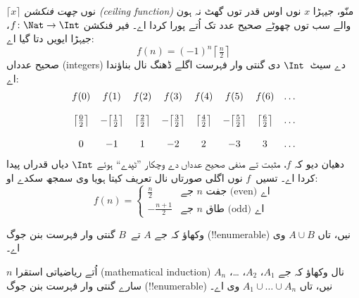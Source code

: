 \documentclass[../../../include/open-logic-section]{subfiles}
\begin{document}
\begin{ex}
$\lceil x \rceil$ نوں \emph{چھت فنکشن (ceiling function)} منّو، جیہڑا
$x$ نوں اوس قدر توں گھٹ نہ ہون والے سب توں چھوٹے صحیح عدد تک اُتے پورا
کردا اے۔ فیر فنکشن
$f \colon \Nat \to \Int$، جیہڑا ایویں دتا گیا اے:
\[
  f(n) = (-1)^{n} \left\lceil\tfrac{n}{2}\right\rceil
\]
صحیح عدداں (integers) دے سیٹ~$\Int$ دی گنتی وار فہرست اگلے ڈھنگ نال
بناؤندا اے:
\[
\begin{array}{c c c c c c c c}
f(0) & f(1) & f(2) & f(3) & f(4) & f(5) & f(6) & \dots \\ \\
\big\lceil \tfrac{0}{2} \big\rceil & -\big\lceil \tfrac{1}{2}\big\rceil &  \big\lceil \tfrac{2}{2} \big\rceil & -\big\lceil \tfrac{3}{2} \big\rceil & \big\lceil \tfrac{4}{2} \big\rceil  & -\big\lceil \tfrac{5}{2}\big\rceil & \big\lceil \tfrac{6}{2} \big\rceil & \dots \\ \\
0 & -1 & 1 & -2 & 2 & -3 & 3& \dots
\end{array}
\]
دھیان دیو کہ $f$، مثبت تے منفی صحیح عدداں دے وچکار ”ٹپدے“ ہوئے
$\Int$ دیاں قدراں پیدا کردا اے۔ تسیں~$f$ نوں اگلی صورتاں نال تعریف
کیتا ہویا وی سمجھ سکدے او:
\[
f(n) = \begin{cases}
  \frac{n}{2} & \text{جے $n$ جفت (even) اے}\\
  -\frac{n+1}{2} & \text{جے $n$ طاق (odd) اے}
  \end{cases}
\]
\end{ex}

\begin{prob}
وکھاؤ کہ جے $A$ تے~$B$ گنتی وار فہرست بنن جوگ (!!{enumerable}) نیں،
تاں $A \cup B$ وی اے۔
\end{prob}

\begin{prob}
$n$ اُتے ریاضیاتی استقرا (mathematical induction) نال وکھاؤ کہ جے
$A_1$، $A_2$، \dots، $A_n$ سارے گنتی وار فہرست بنن جوگ
(!!{enumerable}) نیں، تاں $A_1 \cup \dots \cup A_n$ وی اے۔
\end{prob}
\end{document}
